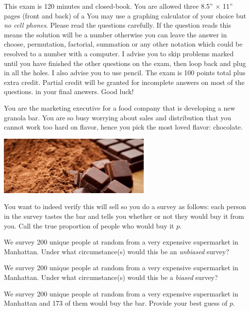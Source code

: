 \documentclass[12pt]{article}
\begin{document}
This exam is 120 minutes and closed-book. You are allowed three 8.5'' $\times$ 11'' pages (front and back) of a  You may use a graphing calculator of your choice but \emph{no cell phones}. Please read the questions carefully. If the question reads  this means the solution will be a number otherwise you can leave the answer in choose, permutation, factorial, summation or any other notation which could be resolved to a number with a computer. I advise you to skip problems marked  until you have finished the other questions on the exam, then loop back and plug in all the holes. I also advise you to use pencil. The exam is 100 points total plus extra credit. Partial credit will be granted for incomplete answers on most of the questions.  in your final answers. Good luck!

\pagebreak

\problem You are the marketing executive for a food company that is developing a new granola bar. You are so busy worrying about sales and distribution that you cannot work too hard on flavor, hence you pick the most loved flavor: chocolate. 

\begin{center}
\includegraphics[width=3in]{chocolate.png}
\end{center}

\noindent You want to indeed verify this will sell so you do a survey as follows: each person in the survey tastes the bar and tells you whether or not they would buy it from you. Call the true proportion of people who would buy it $p$.


\benum

 We survey 200 unique people at random from a very expensive supermarket in Manhattan. Under what circumstance(s) would this be an \emph{unbiased} survey?  

 We survey 200 unique people at random from a very expensive supermarket in Manhattan. Under what circumstance(s) would this be a \emph{biased} survey?  

 We survey 200 unique people at random from a very expensive supermarket in Manhattan and 173 of them would buy the bar. Provide your best guess of $p$.  
\end{document}
